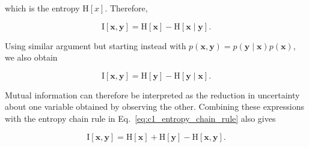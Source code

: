 \documentclass[10pt,twocolumn]{memoir}
\begin{document}
which is the entropy $\mathrm{H}\left[x\right]$. Therefore,

\begin{equation}
    \mathrm{I}[\mathbf{x},\mathbf{y}] = \mathrm{H}[\mathbf{x}] - \mathrm{H}[\mathbf{x}\mid\mathbf{y}].
\end{equation}

Using similar argument but starting instead with $p(\mathbf{x},\mathbf{y}) = p(\mathbf{y}\mid\mathbf{x})p(\mathbf{x})$, we also obtain

\begin{equation}
    \mathrm{I}[\mathbf{x},\mathbf{y}] = \mathrm{H}[\mathbf{y}] - \mathrm{H}[\mathbf{y}\mid\mathbf{x}].
\end{equation}

Mutual information can therefore be interpreted as the reduction in uncertainty about one variable obtained by observing the other. Combining these expressions with the entropy chain rule in Eq.~\ref{eq:c1_entropy_chain_rule} also gives

\begin{equation}
    \mathrm{I}[\mathbf{x},\mathbf{y}] = \mathrm{H}[\mathbf{x}] + \mathrm{H}[\mathbf{y}] - \mathrm{H}[\mathbf{x},\mathbf{y}].
\end{equation}
\end{document}
